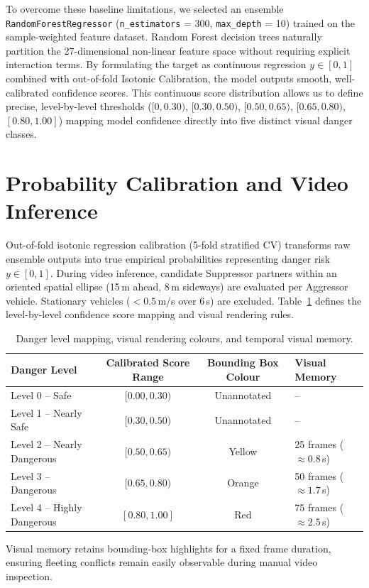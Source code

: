 To overcome these baseline limitations, we selected an ensemble \texttt{RandomForestRegressor} (\texttt{n\_estimators} = 300, \texttt{max\_depth} = 10) trained on the sample-weighted feature dataset. Random Forest decision trees naturally partition the 27-dimensional non-linear feature space without requiring explicit interaction terms. By formulating the target as continuous regression $y \in [0, 1]$ combined with out-of-fold Isotonic Calibration, the model outputs smooth, well-calibrated confidence scores. This continuous score distribution allows us to define precise, level-by-level thresholds ($[0, 0.30)$, $[0.30, 0.50)$, $[0.50, 0.65)$, $[0.65, 0.80)$, $[0.80, 1.00]$) mapping model confidence directly into five distinct visual danger classes.

\section{Probability Calibration and Video Inference}

Out-of-fold isotonic regression calibration (5-fold stratified CV) transforms raw ensemble outputs into true empirical probabilities representing danger risk $y \in [0, 1]$. During video inference, candidate Suppressor partners within an oriented spatial ellipse (15\,m ahead, 8\,m sideways) are evaluated per Aggressor vehicle. Stationary vehicles ($< 0.5$\,m/s over 6\,s) are excluded. Table~\ref{tab:danger_levels} defines the level-by-level confidence score mapping and visual rendering rules.

\begin{table}[H]
\centering
\caption{Danger level mapping, visual rendering colours, and temporal visual memory.}
\label{tab:danger_levels}
\begin{tabular}{l c c l}
\toprule
\textbf{Danger Level} & \textbf{Calibrated Score Range} & \textbf{Bounding Box Colour} & \textbf{Visual Memory} \\
\midrule
Level 0 -- Safe             & $[0.00, 0.30)$ & Unannotated & -- \\
Level 1 -- Nearly Safe      & $[0.30, 0.50)$ & Unannotated & -- \\
Level 2 -- Nearly Dangerous & $[0.50, 0.65)$ & Yellow      & 25 frames ($\approx 0.8$\,s) \\
Level 3 -- Dangerous        & $[0.65, 0.80)$ & Orange      & 50 frames ($\approx 1.7$\,s) \\
Level 4 -- Highly Dangerous & $[0.80, 1.00]$ & Red         & 75 frames ($\approx 2.5$\,s) \\
\bottomrule
\end{tabular}
\end{table}

Visual memory retains bounding-box highlights for a fixed frame duration, ensuring fleeting conflicts remain easily observable during manual video inspection.